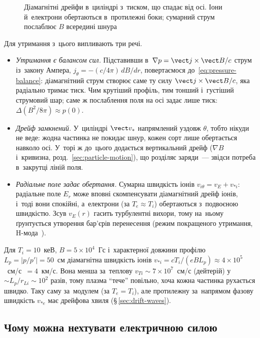 \begin{figure}[ht]\centering
	\caption{Діамагнітні дрейфи в~циліндрі з~тиском, що спадає від осі. Іони й~електрони
	обертаються в~протилежні боки; сумарний струм послаблює $B$ всередині шнура}
	\label{fig:diamagnetic-cylinder}
\end{figure}

Для утримання з~цього випливають три речі.
\begin{itemize}
	\item \emph{Утримання є балансом сил.} Підставивши в~$\nabla p=\vect j\times\vect B/c$ струм із~закону Ампера, $j_\theta=-(c/4\pi)\,dB/dr$, повертаємося
	до~\eqref{eq:pressure-balance}: діамагнітний струм створює саме ту силу $\vect j\times\vect B/c$,
	яка радіально тримає тиск. Чим крутіший профіль, тим тонший і~густіший струмовий шар; саме ж послаблення поля
	на осі задає лише тиск: $\Delta(B^2/8\pi)\approx p(0)$.
	\item \emph{Дрейф замкнений.} У~циліндрі $\vect v_*$ напрямлений уздовж $\theta$, тобто нікуди не веде:
	жодна частинка не покидає шнур, кожен сорт лише обертається навколо осі. У~торі ж до~цього додається
	вертикальний дрейф ($\nabla B$ і~кривизна, розд.~\ref{sec:particle-motion}), що розділяє заряди~--- звідси
	потреба в~закрутці ліній поля.
	\item \emph{Радіальне поле задає обертання.} Сумарна швидкість іонів $v_{i\theta}=v_E+v_{*i}$:
	радіальне поле $E_r$ може вповні скомпенсувати діамагнітний дрейф іонів, і~тоді вони
	спокійні, а~електрони (за $T_e\approx T_i$) обертаються з~подвоєною швидкістю. Зсув $v_E(r)$ гасить турбулентні вихори, тому на~ньому
	ґрунтується утворення бар'єрів перенесення (режим покращеного утримання, H-мода~\cite{chen2016introduction}).
\end{itemize}

\begin{Estimate}
Для $T_i=10$~кеВ, $B=5\times10^4$~Гс і~характерної довжини профілю $L_p=|p/p'|=50$~см
діамагнітна швидкість іонів $v_{*i}=cT_i/(eBL_p)\approx4\times10^5$~см/с~$=4$~км/с. Вона
менша за~теплову $v_{Ti}\sim7\times10^7$~см/с (дейтерій) у~$\sim L_p/r_{Li}\sim10^{2}$ разів, тому
плазма \enquote{тече} повільно, хоча кожна частинка рухається швидко. Таку саму за~модулем (за $T_e=T_i$), але протилежну за~напрямом фазову швидкість
$v_{*e}$ має дрейфова хвиля (§\,\ref{sec:drift-waves}).
\end{Estimate}


\subsection*{Чому можна нехтувати електричною силою}


